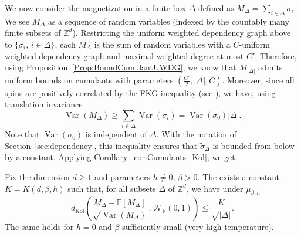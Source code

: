 \documentclass[envcountsame]{svmult}
\newcommand{\Z}{\mathbb{Z}}
\newcommand{\R}{\mathbb{R}}
\newcommand{\esper}{\mathbb{E}}
\newcommand{\dkol}{d_\mathrm{Kol}}
\newcommand{\gauss}{\mathcal{N}_{\R}(0,1)}
\DeclareMathOperator{\Var}{Var}
\begin{document}
We now consider the magnetization in a finite box $\Delta$ defined
as $M_{\Delta}= \sum_{i \in \Delta} \sigma_i$.
We see $M_\Delta$ as a sequence of random variables (indexed by the countably many finite subsets of $\Z^d$).
Restricting the uniform weighted dependency graph above to $\{\sigma_i,\, i \in \Delta\}$,
each $M_\Delta$ is the sum of random variables with a $C$-uniform weighted dependency graph
and maximal weighted degree at most $C'$.
Therefore, using Proposition~\ref{Prop:BoundCumulantUWDG}, we know that
$M_{|\Delta|}$ admits uniform bounds on cumulants with parameters $(\tfrac{C'}{2},|\Delta|,C)$. 
Moreover, since all spins are positively correlated by the FKG inequality (see \cite[Section 3.6]{Velenik}),
we have, using translation invariance
\[\Var(M_\Delta) \ge \sum_{i \in \Delta} \Var(\sigma_i) = \Var(\sigma_0) |\Delta|.\]
Note that $\Var(\sigma_0)$ is independent of $\Delta$.
With the notation of Section~\ref{sec:dependency},
this inequality ensures that $\widetilde{\sigma}_\Delta$ is bounded from below by a constant.
Applying Corollary~\ref{cor:Cumulants_Kol}, we get:
\begin{proposition}
  Fix the dimension $d \geq 1$ and parameters $h \ne 0,\,\beta>0$.
  The exists a constant $K=K(d,\beta,h)$ such that, for all subsets $\Delta$ of $\Z^d$, we have under $\mu_{\beta,h}$
  \[\dkol\left( \frac{M_\Delta-\esper[M_\Delta]}{\sqrt{\Var(M_\Delta)}}\,,\, \gauss\right) \le \frac{K}{\sqrt{|\Delta|}}.\]
  The same holds for $h=0$ and $\beta$ sufficiently small (very high temperature).
  \label{prop:Kol_Ising}
\end{proposition}
\end{document}
